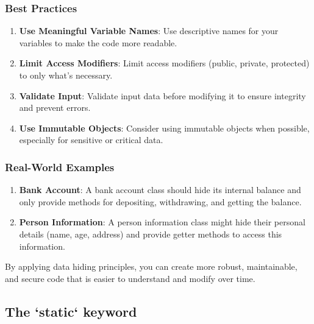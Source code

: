 \documentclass{book}
\begin{document}
\subsubsection{Best Practices}

\begin{enumerate}
	\item \textbf{Use Meaningful Variable Names}: Use descriptive names for your variables to make the code more readable.
	\item \textbf{Limit Access Modifiers}: Limit access modifiers (public, private, protected) to only what's necessary.
	\item \textbf{Validate Input}: Validate input data before modifying it to ensure integrity and prevent errors.
	\item \textbf{Use Immutable Objects}: Consider using immutable objects when possible, especially for sensitive or critical data.
\end{enumerate}

\subsubsection{Real-World Examples}

\begin{enumerate}
	\item \textbf{Bank Account}: A bank account class should hide its internal balance and only provide methods for depositing, withdrawing, and getting the balance.
	\item \textbf{Person Information}: A person information class might hide their personal details (name, age, address) and provide getter methods to access this information.
\end{enumerate}

By applying data hiding principles, you can create more robust, maintainable, and secure code that is easier to understand and modify over time.
\subsection{The `static` keyword}
\end{document}
